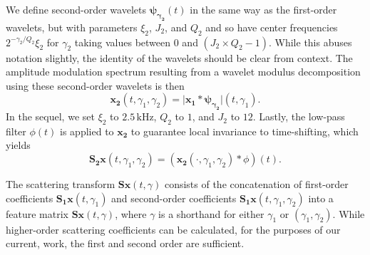 \documentclass[journal]{IEEEtran}
\begin{document}
We define second-order wavelets $\boldsymbol{\psi_{\gamma_2}}(t)$ in the same way as the first-order wavelets, but with parameters $\xi_2$, $J_2$, and $Q_2$ and so have center frequencies $2^{-\gamma_2/Q_2}\xi_2$ for $\gamma_2$ taking values between $0$ and $(J_2 \times Q_2 - 1)$. While this abuses notation slightly, the identity of the wavelets should be clear from context.
The amplitude modulation spectrum resulting from a wavelet modulus decomposition using these second-order wavelets is then
\begin{equation}
\boldsymbol{x_2}(t,\gamma_1,\gamma_2) =
\vert \boldsymbol{x_1} \ast \boldsymbol{\psi_{\gamma_2}} \vert(t,\gamma_1).
\end{equation}
In the sequel, we set $\xi_2$ to $2.5\,\mathrm{kHz}$, $Q_2$ to $1$, and $J_2$ to $12$. Lastly, the low-pass filter $\phi(t)$ is applied to $\boldsymbol{x_2}$ to guarantee local invariance to time-shifting, which yields
\begin{equation}
\mathbf{S_2}\boldsymbol{x}(t,\gamma_1,\gamma_2) =
(\boldsymbol{x_2}(\cdot,\gamma_1,\gamma_2) \ast \phi)(t).
\end{equation}

The scattering transform $\mathbf{S}\boldsymbol{x}(t,\gamma)$ consists of the concatenation of first-order coefficients $\mathbf{S_1}\boldsymbol{x}(t,\gamma_1)$ and second-order coefficients $\mathbf{S_1}\boldsymbol{x}(t,\gamma_1,\gamma_2)$ into a feature matrix $\mathbf{S}\boldsymbol{x}(t,\gamma)$, where $\gamma$ is a shorthand for either $\gamma_1$ or $(\gamma_1,\gamma_2)$. While higher-order scattering coefficients can be calculated, for the purposes of our current, work, the first and second order are sufficient.
\end{document}
